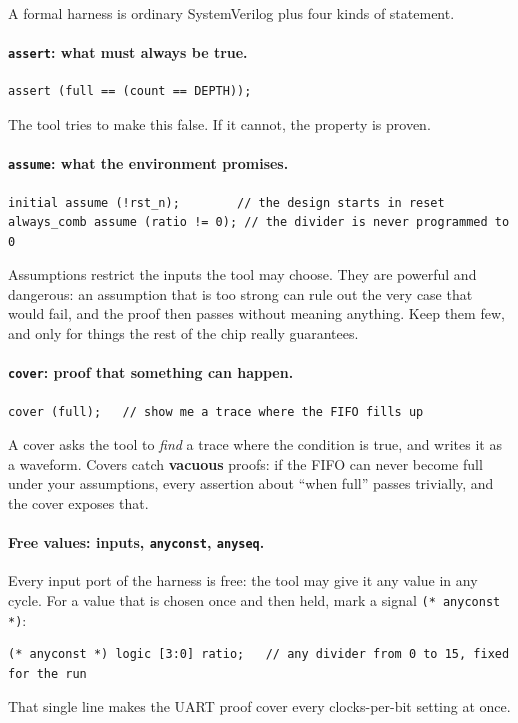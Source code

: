 \documentclass[11pt,a4paper]{article}
\begin{document}
A formal harness is ordinary SystemVerilog plus four kinds of statement.

\paragraph{\texttt{assert}: what must always be true.}
\begin{lstlisting}
assert (full == (count == DEPTH));
\end{lstlisting}
The tool tries to make this false. If it cannot, the property is proven.

\paragraph{\texttt{assume}: what the environment promises.}
\begin{lstlisting}
initial assume (!rst_n);        // the design starts in reset
always_comb assume (ratio != 0); // the divider is never programmed to 0
\end{lstlisting}
Assumptions restrict the inputs the tool may choose. They are powerful and dangerous: an assumption that is too strong can rule out the very case that would fail, and the proof then passes without meaning anything. Keep them few, and only for things the rest of the chip really guarantees.

\paragraph{\texttt{cover}: proof that something can happen.}
\begin{lstlisting}
cover (full);   // show me a trace where the FIFO fills up
\end{lstlisting}
A cover asks the tool to \emph{find} a trace where the condition is true, and writes it as a waveform. Covers catch \textbf{vacuous} proofs: if the FIFO can never become full under your assumptions, every assertion about ``when full'' passes trivially, and the cover exposes that.

\paragraph{Free values: inputs, \texttt{anyconst}, \texttt{anyseq}.}
Every input port of the harness is free: the tool may give it any value in any cycle. For a value that is chosen once and then held, mark a signal \texttt{(* anyconst *)}:
\begin{lstlisting}
(* anyconst *) logic [3:0] ratio;   // any divider from 0 to 15, fixed for the run
\end{lstlisting}
That single line makes the UART proof cover every clocks-per-bit setting at once.
\end{document}
